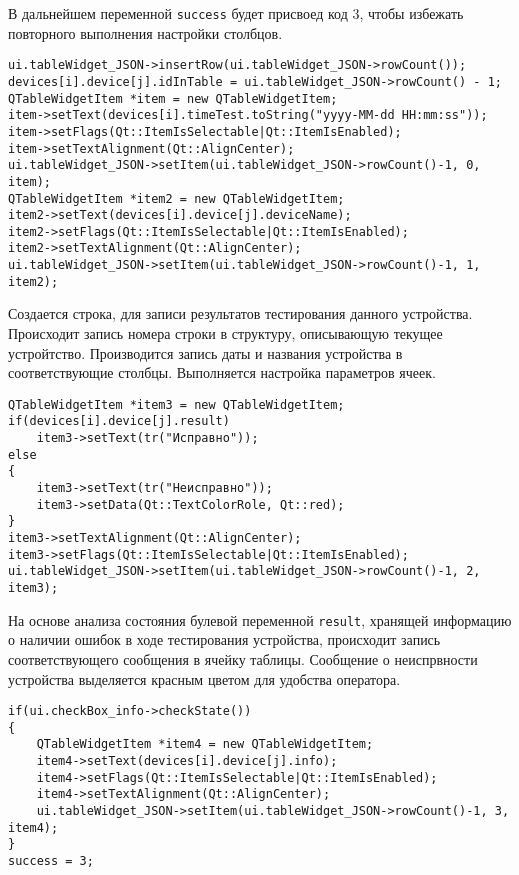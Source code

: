 В дальнейшем переменной \texttt{success} будет присвоед код 3, чтобы избежать повторного выполнения настройки столбцов.
\medskip
\begin{verbatim}
ui.tableWidget_JSON->insertRow(ui.tableWidget_JSON->rowCount());
devices[i].device[j].idInTable = ui.tableWidget_JSON->rowCount() - 1;
QTableWidgetItem *item = new QTableWidgetItem;
item->setText(devices[i].timeTest.toString("yyyy-MM-dd HH:mm:ss"));
item->setFlags(Qt::ItemIsSelectable|Qt::ItemIsEnabled);
item->setTextAlignment(Qt::AlignCenter);
ui.tableWidget_JSON->setItem(ui.tableWidget_JSON->rowCount()-1, 0, item);
QTableWidgetItem *item2 = new QTableWidgetItem;
item2->setText(devices[i].device[j].deviceName);
item2->setFlags(Qt::ItemIsSelectable|Qt::ItemIsEnabled);
item2->setTextAlignment(Qt::AlignCenter);
ui.tableWidget_JSON->setItem(ui.tableWidget_JSON->rowCount()-1, 1, item2);
\end{verbatim}
\medskip

Создается строка, для записи результатов тестирования данного устройства. Происходит запись номера строки в структуру,
описывающую текущее устройтство. Производится запись даты и названия устройства в соответствующие столбцы. Выполняется
настройка параметров ячеек.

\medskip
\begin{verbatim}
QTableWidgetItem *item3 = new QTableWidgetItem;
if(devices[i].device[j].result)
	item3->setText(tr("Исправно"));
else
{
	item3->setText(tr("Неисправно"));
	item3->setData(Qt::TextColorRole, Qt::red);
}
item3->setTextAlignment(Qt::AlignCenter);
item3->setFlags(Qt::ItemIsSelectable|Qt::ItemIsEnabled);
ui.tableWidget_JSON->setItem(ui.tableWidget_JSON->rowCount()-1, 2, item3);
\end{verbatim}
\medskip

На основе анализа состояния булевой переменной \texttt{result}, хранящей информацию о наличии ошибок в ходе тестирования
устройства, происходит запись соответствующего сообщения в ячейку таблицы. Сообщение о неиспрвности устройства
выделяется красным цветом для удобства оператора.

\medskip
\begin{verbatim}
if(ui.checkBox_info->checkState())
{
	QTableWidgetItem *item4 = new QTableWidgetItem;
	item4->setText(devices[i].device[j].info);
	item4->setFlags(Qt::ItemIsSelectable|Qt::ItemIsEnabled);
	item4->setTextAlignment(Qt::AlignCenter);
	ui.tableWidget_JSON->setItem(ui.tableWidget_JSON->rowCount()-1, 3, item4);
}
success = 3;
\end{verbatim}
\medskip

